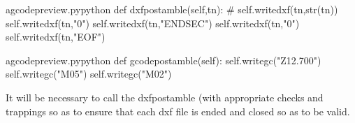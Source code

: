 \documentclass{ltxdoc}
\begin{document}
\lstset{firstnumber=\thegcpy}
\begin{writecode}{a}{gcodepreview.py}{python}
    def dxfpostamble(self,tn):
#        self.writedxf(tn,str(tn))
        self.writedxf(tn,"0")
        self.writedxf(tn,"ENDSEC")
        self.writedxf(tn,"0")
        self.writedxf(tn,"EOF")
        
\end{writecode}
\addtocounter{gcpy}{7}

\lstset{firstnumber=\thegcpy}
\begin{writecode}{a}{gcodepreview.py}{python}
    def gcodepostamble(self):
        self.writegc("Z12.700")
        self.writegc("M05")
        self.writegc("M02")
        
\end{writecode}
\addtocounter{gcpy}{5}


It will be necessary to call the dxfpostamble (with appropriate checks and trappings so as to ensure that each dxf file is ended and closed so as to be valid.
 
\end{document}
